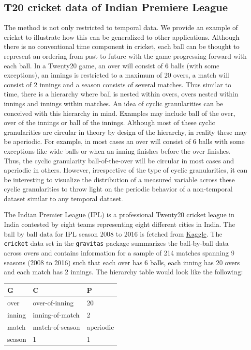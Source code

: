 \documentclass[12pt]{article}
\begin{document}
\hypertarget{sec:cricket}{%
\subsection{T20 cricket data of Indian Premiere League}\label{sec:cricket}}

The method is not only restricted to temporal data. We provide an example of cricket to illustrate how this can be generalized to other applications. Although there is no conventional time component in cricket, each ball can be thought to represent an ordering from past to future with the game progressing forward with each ball. In a Twenty20 game, an over will consist of 6 balls (with some exceptions), an innings is restricted to a maximum of 20 overs, a match will consist of 2 innings and a season consists of several matches. Thus similar to time, there is a hierarchy where ball is nested within overs, overs nested within innings and innings within matches. An idea of cyclic granularities can be conceived with this hierarchy in mind. Examples may include ball of the over, over of the innings or ball of the innings. Although most of these cyclic granularities are circular in theory by design of the hierarchy, in reality these may be aperiodic. For example, in most cases an over will consist of 6 balls with some exceptions like wide balls or when an inning finishes before the over finishes. Thus, the cyclic granularity ball-of-the-over will be circular in most cases and aperiodic in others. However, irrespective of the type of cyclic granularities, it can be interesting to visualize the distribution of a measured variable across these cyclic granularities to throw light on the periodic behavior of a non-temporal dataset similar to any temporal dataset.

The Indian Premier League (IPL) is a professional Twenty20 cricket league in India contested by eight teams representing eight different cities in India. The ball by ball data for IPL season 2008 to 2016 is fetched from \href{https://www.kaggle.com/josephgpinto/ipl-data-analysis/data}{Kaggle}. The \texttt{cricket} data set in the \texttt{gravitas} package summarizes the ball-by-ball data across overs and contains information for a sample of 214 matches spanning 9 seasons (2008 to 2016) such that each over has 6 balls, each inning has 20 overs and each match has 2 innings. The hierarchy table would look like the following:

\begin{longtable}[]{@{}lll@{}}
\toprule
G & C & P\tabularnewline
\midrule
\endhead
over & over-of-inning & 20\tabularnewline
inning & inning-of-match & 2\tabularnewline
match & match-of-season & aperiodic\tabularnewline
season & 1 & 1\tabularnewline
\bottomrule
\end{longtable}
\end{document}
